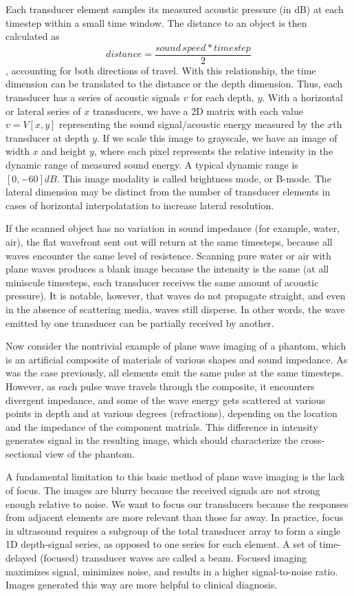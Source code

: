  Each transducer element samples its measured acoustic pressure (in dB) at each timestep within a small time window. The distance to an object is then calculated as $$distance = \frac{sound\,speed * timestep}{2}$$, accounting for both directions of travel. With this relationship, the time dimension can be translated to the distance or the depth dimension. Thus, each transducer has a series of acoustic signals $v$ for each depth, $y$. With a horizontal or lateral series of $x$ transducers, we have a 2D matrix with each value $v = V[x, y]$ representing the sound signal/acoustic energy measured by the $x$th transducer at depth $y$. If we scale this image to grayscale, we have an image of width $x$ and height $y$, where each pixel represents the relative intensity in the dynamic range of measured sound energy. A typical dynamic range is $[0, -60]dB$. This image modality is called brightness mode, or B-mode. The lateral dimension may be distinct from the number of transducer elements in cases of horizontal interpolatation to increase lateral resolution.

 If the scanned object has no variation in sound impedance (for example, water, air), the flat wavefront sent out will return at the same timesteps, because all waves encounter the same level of resistence. Scanning pure water or air with plane waves produces a blank image because the intensity is the same (at all miniscule timesteps, each transducer receives the same amount of acoustic pressure). It is notable, however, that waves do not propagate straight, and even in the absence of scattering media, waves still disperse. In other words, the wave emitted by one transducer can be partially received by another.

 Now consider the nontrivial example of plane wave imaging of a phantom, which is an artificial composite of materials of various shapes and sound impedance. As was the case previously, all elements emit the same pulse at the same timesteps. However, as each pulse wave travels through the composite, it encounters divergent impedance, and some of the wave energy gets scattered at various points in depth and at various degrees (refractions), depending on the location and the impedance of the component matrials. This difference in intensity generates signal in the resulting image, which should characterize the cross-sectional view of the phantom.

 A fundamental limitation to this basic method of plane wave imaging is the lack of focus. The images are blurry because the received signals are not strong enough relative to noise. We want to focus our transducers because the responses from adjacent elements are more relevant than those far away. In practice, focus in ultrasound requires a subgroup of the total transducer array to form a single 1D depth-signal series, as opposed to one series for each element. A set of time-delayed (focused) transducer waves are called a beam. Focused imaging maximizes signal, minimizes noise, and results in a higher signal-to-noise ratio. Images generated this way are more helpful to clinical diagnosis.

